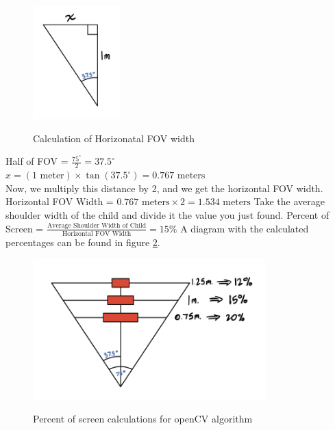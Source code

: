 \documentclass[journal,onecolumn, draftclsnofoot, 12pt]{IEEEtran}
\begin{document}
\begin{figure}[H]
\begin{center}
    \includegraphics[width=0.3\textwidth]{calc1.png}\\
    \caption{Calculation of Horizonatal FOV width} 
    \label{fig:calc1}
\end{center}
\end{figure}

Half of FOV = \( \frac{75^\circ}{2} = 37.5^\circ \) \\
 
$x = (1 \text{ meter}) \times \tan(37.5^\circ) = 0.767 \text{ meters}$ \\
Now, we multiply this distance by 2, and we get the horizontal FOV width.
Horizontal FOV Width = $0.767 \text{ meters} \times 2 = 1.534 \text{ meters}$ 
Take the average shoulder width of the child and divide it the value you just found.
Percent of Screen = $\frac{\text{Average Shoulder Width of Child}}{\text{Horizontal FOV Width}} = 15\%$
A diagram with the calculated percentages can be found in figure \ref{fig:calc2}.

\begin{figure}[H]
\begin{center}
    \includegraphics[width=0.8\textwidth]{calc2.png}\\
    \caption{Percent of screen calculations for openCV algorithm} 
    \label{fig:calc2}
\end{center}
\end{figure}
 
\end{document}
